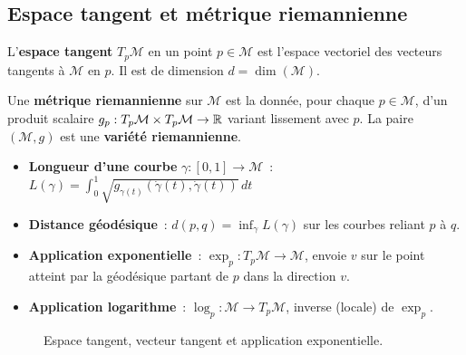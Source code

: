 \subsection{Espace tangent et m\'etrique riemannienne}

\begin{definition}
L'\textbf{espace tangent} $T_p\mathcal{M}$ en un point $p \in \mathcal{M}$
est l'espace vectoriel des vecteurs tangents \`a $\mathcal{M}$ en $p$. Il
est de dimension $d = \dim(\mathcal{M})$.
\end{definition}

\begin{definition}
Une \textbf{m\'etrique riemannienne} sur $\mathcal{M}$ est la donn\'ee, pour
chaque $p \in \mathcal{M}$, d'un produit scalaire
$g_p: T_p\mathcal{M} \times T_p\mathcal{M} \to \mathbb{R}$ variant lissement avec $p$.
La paire $(\mathcal{M}, g)$ est une \textbf{vari\'et\'e riemannienne}.
\end{definition}

\begin{formules}[title=\textbf{Objets de base en g\'eom\'etrie riemannienne}]
\begin{itemize}
    \item \textbf{Longueur d'une courbe} $\gamma: [0,1] \to \mathcal{M}$~:
          $L(\gamma) = \int_0^1 \sqrt{g_{\gamma(t)}(\dot{\gamma}(t), \dot{\gamma}(t))}\, dt$
    \item \textbf{Distance g\'eod\'esique}~:
          $d(p, q) = \inf_\gamma L(\gamma)$ sur les courbes reliant $p$ \`a $q$.
    \item \textbf{Application exponentielle}~:
          $\exp_p: T_p\mathcal{M} \to \mathcal{M}$, envoie $v$ sur le point
          atteint par la g\'eod\'esique partant de $p$ dans la direction $v$.
    \item \textbf{Application logarithme}~:
          $\log_p: \mathcal{M} \to T_p\mathcal{M}$, inverse (locale) de $\exp_p$.
\end{itemize}
\end{formules}

\begin{figure}[htbp]
\centering
{}
\caption{Espace tangent, vecteur tangent et application exponentielle.}
\end{figure}

